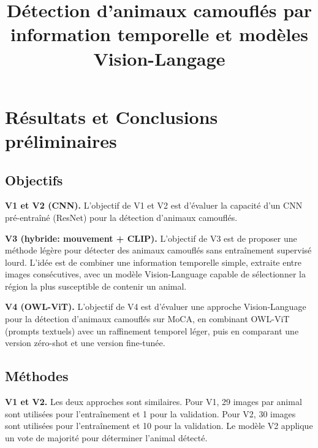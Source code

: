 \documentclass{article}
\title{Détection d’animaux camouflés par information temporelle et modèles Vision-Langage}
\begin{document}
\maketitle

\section{Résultats et Conclusions préliminaires}

\subsection{Objectifs}

\textbf{V1 et V2 (CNN).} 
L'objectif de V1 et V2 est d’évaluer la capacité d’un CNN pré-entraîné (ResNet) pour la détection d’animaux camouflés.

\textbf{V3 (hybride: mouvement + CLIP).}
L’objectif de V3 est de proposer une méthode légère pour détecter des animaux camouflés sans entraînement supervisé lourd. L’idée est de combiner une information temporelle simple, extraite entre images consécutives, avec un modèle Vision-Language capable de sélectionner la région la plus susceptible de contenir un animal.

\textbf{V4 (OWL-ViT).} 
L’objectif de V4 est d’évaluer une approche Vision-Language pour la détection d’animaux camouflés sur MoCA, en combinant OWL-ViT (prompts textuels) avec un raffinement temporel léger, puis en comparant une version zéro-shot et une version fine-tunée.


\subsection{Méthodes}

\textbf{V1 et V2.}
Les deux approches sont similaires. Pour V1, 29 images par animal sont utilisées pour l’entraînement et 1 pour la validation. Pour V2, 30 images sont utilisées pour l’entraînement et 10 pour la validation. Le modèle V2 applique un vote de majorité pour déterminer l’animal détecté.
\end{document}
